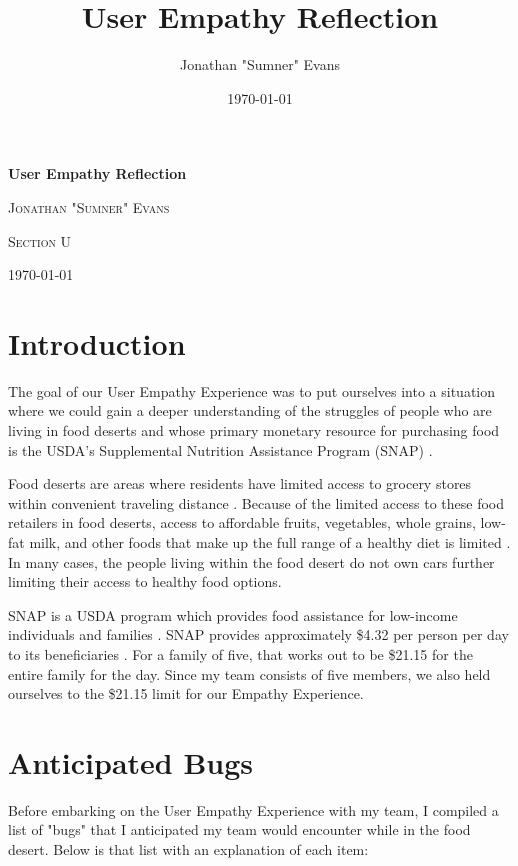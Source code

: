 \documentclass[11pt]{article}
\title{User Empathy Reflection}
\author{Jonathan "Sumner" Evans}
\date{\today}
\begin{document}
\begin{titlepage}
    \centering
    \vspace{5cm}
    {\huge\bfseries User Empathy Reflection \par}
    \vspace{1cm}
    {\scshape\Large Jonathan "Sumner" Evans\par}
    \vfill
    {\scshape\large Section U\par}
    {\large \today\par}
    \vfill
\end{titlepage}

\section{Introduction}
The goal of our User Empathy Experience was to put ourselves into a situation where we could gain a
deeper understanding of the struggles of people who are living in food deserts and whose primary
monetary resource for purchasing food is the USDA's Supplemental Nutrition Assistance Program
(SNAP) \cite{usda-snap}.

Food deserts are areas where residents have limited access to grocery stores within convenient
traveling distance \cite{fep}. Because of the limited access to these food retailers in food
deserts, access to affordable fruits, vegetables, whole grains, low-fat milk, and other foods that
make up the full range of a healthy diet is limited \cite{cdc}. In many cases, the people living
within the food desert do not own cars \cite{usda-access} further limiting their access to healthy
food options.

SNAP is a USDA program which provides food assistance for low-income individuals and families
\cite{usda-snap}. SNAP provides approximately \$4.32 per person per day to its beneficiaries
\cite{cbpp}. For a family of five, that works out to be \$21.15 for the entire family for the day.
Since my team consists of five members, we also held ourselves to the \$21.15 limit for our Empathy
Experience.

\section{Anticipated Bugs}
Before embarking on the User Empathy Experience with my team, I compiled a list of "bugs" that I
anticipated my team would encounter while in the food desert. Below is that list with an explanation
of each item:
\end{document}
